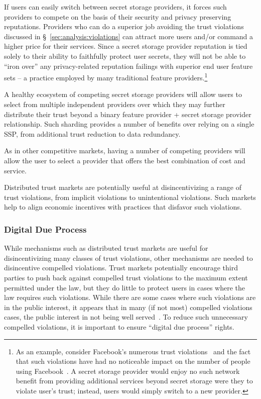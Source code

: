 \begin{packed_desc}
\item[Reputation:] If users can easily switch between secret storage
  providers, it forces such providers to compete on the basis of their
  security and privacy preserving reputations. Providers who can do a
  superior job avoiding the trust violations discussed in
  \S~\ref{sec:analysis:violations} can attract more users and/or
  command a higher price for their services. Since a secret storage
  provider reputation is tied solely to their ability to faithfully
  protect user secrets, they will not be able to ``iron over'' any
  privacy-related reputation failings with superior end user feature
  sets -- a practice employed by many traditional feature
  providers.\footnote{As an example, consider Facebook's numerous
    trust violations~\cite{goel2014, lomas2014, tsukayama2014} and the
    fact that such violations have had no noticeable impact on the
    number of people using Facebook~\cite{foster2014}. A secret
    storage provider would enjoy no such network benefit from
    providing additional services beyond secret storage were they to
    violate user's trust; instead, users would simply switch to a new
    provider.}
\item[Multiple Providers:] A healthy ecosystem of competing secret
  storage providers will allow users to select from multiple
  independent providers over which they may further distribute their
  trust beyond a binary feature provider + secret storage provider
  relationship. Such sharding provides a number of benefits over
  relying on a single SSP, from additional trust reduction to data
  redundancy.
\item[Cost:] As in other competitive markets, having a number of
  competing providers will allow the user to select a provider that
  offers the best combination of cost and service.
\end{packed_desc}

Distributed trust markets are potentially useful at disincentivizing a
range of trust violations, from implicit violations to unintentional
violations. Such markets help to align economic incentives with
practices that disfavor such violations.

\subsubsection{Digital Due Process}

While mechanisms such as distributed trust markets are useful for
disincentivizing many classes of trust violations, other mechanisms
are needed to disincentive compelled violations. Trust markets
potentially encourage third parties to push back against compelled
trust violations to the maximum extent permitted under the law, but
they do little to protect users in cases where the law requires such
violations. While there are some cases where such violations are in
the public interest, it appears that in many (if not most) compelled
violations cases, the public interest in not being well
served~\cite{greenwald-prism, greenwald-collect}. To reduce such
unnecessary compelled violations, it is important to ensure ``digital
due process'' rights.

